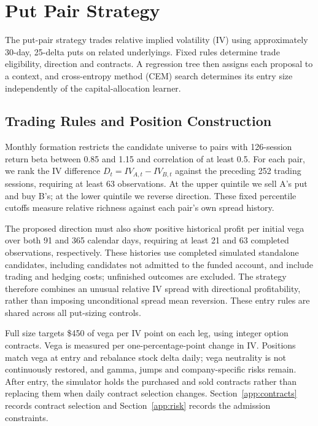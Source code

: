 \section{Put Pair Strategy}\label{sec:4}

The put-pair strategy trades relative implied volatility (IV) using approximately 30-day, 25-delta puts on related underlyings. Fixed rules determine trade eligibility, direction and contracts. A regression tree then assigns each proposal to a context, and cross-entropy method (CEM) search determines its entry size independently of the capital-allocation learner.

\subsection{Trading Rules and Position Construction}

Monthly formation restricts the candidate universe to pairs with 126-session return beta between 0.85 and 1.15 and correlation of at least 0.5. For each pair, we rank the IV difference \(D_t=IV_{A,t}-IV_{B,t}\) against the preceding 252 trading sessions, requiring at least 63 observations. At the upper quintile we sell A's put and buy B's; at the lower quintile we reverse direction. These fixed percentile cutoffs measure relative richness against each pair's own spread history.

The proposed direction must also show positive historical profit per initial vega over both 91 and 365 calendar days, requiring at least 21 and 63 completed observations, respectively. These histories use completed simulated standalone candidates, including candidates not admitted to the funded account, and include trading and hedging costs; unfinished outcomes are excluded. The strategy therefore combines an unusual relative IV spread with directional profitability, rather than imposing unconditional spread mean reversion. These entry rules are shared across all put-sizing controls.

Full size targets \$450 of vega per IV point on each leg, using integer option contracts. Vega is measured per one-percentage-point change in IV. Positions match vega at entry and rebalance stock delta daily; vega neutrality is not continuously restored, and gamma, jumps and company-specific risks remain. After entry, the simulator holds the purchased and sold contracts rather than replacing them when daily contract selection changes. Section~\ref{app:contracts} records contract selection and Section~\ref{app:risk} records the admission constraints.

